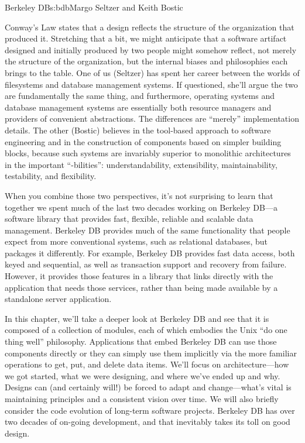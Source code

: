 \begin{aosachapter}{Berkeley DB}{s:bdb}{Margo Seltzer and Keith Bostic}

Conway's Law states that a design reflects the structure of the
organization that produced it. Stretching that a bit, we might
anticipate that a software artifact designed and initially produced by
two people might somehow reflect, not merely the structure of the
organization, but the internal biases and philosophies each brings to
the table. One of us (Seltzer) has spent her career between the worlds
of filesystems and database management systems. If questioned, she'll
argue the two are fundamentally the same thing, and furthermore,
operating systems and database management systems are essentially both
resource managers and providers of convenient abstractions. The
differences are ``merely'' implementation details. The other (Bostic)
believes in the tool-based approach to software engineering and in the
construction of components based on simpler building blocks, because
such systems are invariably superior to monolithic architectures in
the important ``-bilities'': understandability, extensibility,
maintainability, testability, and flexibility.

When you combine those two perspectives, it's not surprising to learn
that together we spent much of the last two decades working on
Berkeley DB---a software library that provides fast, flexible,
reliable and scalable data management.  Berkeley DB provides much of
the same functionality that people expect from more conventional
systems, such as relational databases, but packages it differently.
For example, Berkeley DB provides fast data access, both keyed and
sequential, as well as transaction support and recovery from failure.
However, it provides those features in a library that links directly
with the application that needs those services, rather than being made
available by a standalone server application.

In this chapter, we'll take a deeper look at Berkeley DB and see that
it is composed of a collection of modules, each of which embodies the
Unix ``do one thing well'' philosophy.  Applications that embed
Berkeley DB can use those components directly or they can simply use
them implicitly via the more familiar operations to get, put, and
delete data items.  We'll focus on architecture---how we got started,
what we were designing, and where we've ended up and why. Designs can
(and certainly will!) be forced to adapt and change---what's vital is
maintaining principles and a consistent vision over time. We will also
briefly consider the code evolution of long-term software
projects. Berkeley DB has over two decades of on-going development,
and that inevitably takes its toll on good design.


\end{aosachapter}
